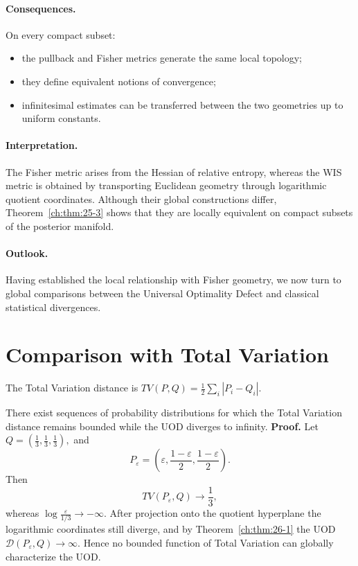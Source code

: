 \paragraph{Consequences.}
\begin{corollary}
\label{ch:cor:25-4}
On every compact subset:
\begin{itemize}
\item the pullback and Fisher metrics generate the same local topology;
\item they define equivalent notions of convergence;
\item infinitesimal estimates can be transferred between the two
    geometries up to uniform constants.
\end{itemize}
\end{corollary}

\paragraph{Interpretation.}
The Fisher metric arises from the Hessian of relative entropy, whereas
the WIS metric is obtained by transporting Euclidean geometry through
logarithmic quotient coordinates.
Although their global constructions differ, Theorem~\ref{ch:thm:25-3} shows that they
are locally equivalent on compact subsets of the posterior manifold.

\paragraph{Outlook.}
Having established the local relationship with Fisher geometry, we now
turn to global comparisons between the Universal Optimality Defect and
classical statistical divergences.
\section{Comparison with Total Variation}\label{ch:sec:comparison-with-total-variation}
The Total Variation distance is
$TV(P,Q)=\frac12\sum_{i}|P_i-Q_i|.$
\begin{theorem}
\label{ch:thm:26-1}
There exist sequences of probability distributions for which the Total
Variation distance remains bounded while the UOD diverges to infinity.
\textbf{Proof.}
Let
$Q=\left(\frac13,\frac13,\frac13\right),$
and
\[ P_\varepsilon= \left( \varepsilon,
\frac{1-\varepsilon}{2}, \frac{1-\varepsilon}{2}
\right). \]
Then
\[ TV(P_\varepsilon,Q)\longrightarrow\frac13,
\]
whereas
$\log\frac{\varepsilon}{1/3}\longrightarrow-\infty.$
After projection onto the quotient hyperplane the logarithmic coordinates still diverge, and by Theorem~\ref{ch:thm:26-1} the UOD
$\mathcal{D}(P_\varepsilon,Q)\longrightarrow\infty.$
Hence no bounded function of Total Variation can globally characterize
the UOD. 
\end{theorem}

